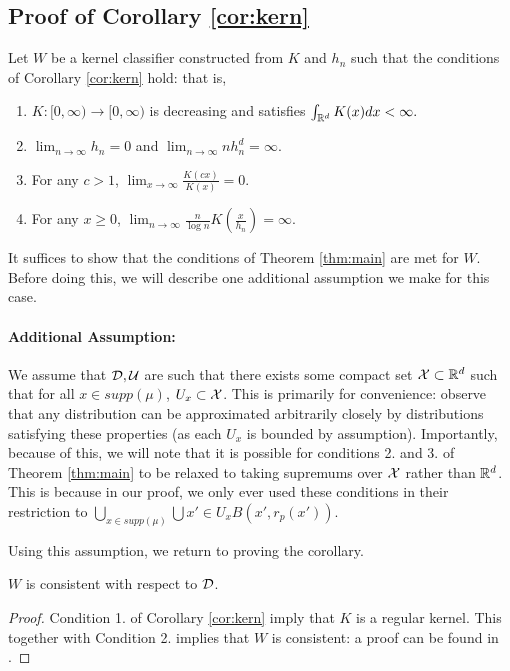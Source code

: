 \subsection{Proof of Corollary \ref{cor:kern}}

Let $W$ be a kernel classifier constructed from $K$ and $h_n$ such that the conditions of Corollary \ref{cor:kern} hold: that is, 
\begin{enumerate}
	\item $K: [0, \infty) \to [0, \infty)$ is decreasing and satisfies $\int_{\mathbb R^d}K(x)dx < \infty.$
	\item $\lim_{n \to \infty} h_n = 0$ and $\lim_{n \to \infty} nh_n^d = \infty$.
	\item For any $c > 1$, $\lim_{x \to \infty} \frac{K(cx)}{K(x)} = 0$.
	\item For any $x \geq 0$, $\lim_{n \to \infty} \frac{n}{\log n}K(\frac{x}{h_n}) = \infty$.
\end{enumerate}

It suffices to show that the conditions of Theorem \ref{thm:main} are met for $W$. Before doing this, we will describe one additional assumption we make for this case.

\paragraph{Additional Assumption:} We assume that ${\mathcal D}, {\mathcal U}$ are such that there exists some compact set $\mathcal X \subset \mathbb R^d$ such that for all $x \in supp(\mu)$, $U_x \subset \mathcal X$. This is primarily for convenience: observe that any distribution can be approximated arbitrarily closely by distributions satisfying these properties (as each $U_x$ is bounded by assumption). Importantly, because of this, we will note that it is possible for conditions 2. and 3. of Theorem \ref{thm:main} to be relaxed to taking supremums over $\mathcal X$ rather than $\mathbb R^d$. This is because in our proof, we only ever used these conditions in their restriction to $\bigcup_{x \in supp(\mu)} \bigcup{x' \in U_x} B(x', r_p(x'))$.

Using this assumption, we return to proving the corollary. 

\begin{lem}\label{cl:kern_consistency}
$W$ is consistent with respect to ${\mathcal D}$. 
\end{lem}

\begin{proof}
Condition 1. of Corollary \ref{cor:kern} imply that $K$ is a regular kernel. This together with Condition 2. implies that $W$ is consistent: a proof can be found in \cite{devroye96}. 
\end{proof}

